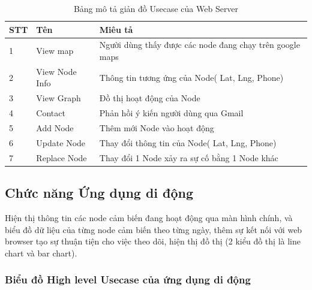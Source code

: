 \begin{table}[H]
\centering
\caption{Bảng mô tả giản đồ Usecase của Web Server}
\label{table:usewebsite}
\begin{tabular}{|l|l|l|}
\hline
STT & Tên            & Miêu tả                                                                                            \\ \hline
1   & View map       & Người dùng thấy được các node đang chạy trên google maps                                           \\ \hline
2   & View Node Info & Thông tin tương ứng của Node( Lat, Lng, Phone)                                                     \\ \hline
3   & View Graph     & Đồ thị hoạt động của Node
\\ \hline
4   & Contact        & Phản hồi ý kiến người dùng qua Gmail                                                               \\ \hline
5   & Add Node       & Thêm mới Node vào hoạt động                                                                        \\ \hline
6   & Update Node    & Thay đổi thông tin của Node( Lat, Lng, Phone)                                                      \\ \hline
7   & Replace Node   & Thay đổi 1 Node xảy ra sự cố bằng 1 Node khác                                                      \\ \hline
\end{tabular}
\end{table}








\subsection*{Chức năng Ứng dụng di động}
Hiện thị thông tin các node cảm biến đang hoạt động qua màn hình chính, và biểu đồ dữ liệu của từng node cảm biến theo từng ngày, thêm sự kết nối với web browser tạo sự thuận tiện cho việc theo dõi, hiện thị đồ thị (2 kiểu đồ thị là line chart và bar chart).
\subsubsection*{Biểu đồ High level Usecase của ứng dụng di động}

